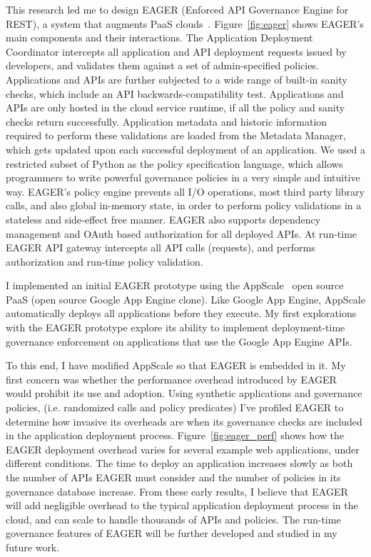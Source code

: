This research led me to design
EAGER (Enforced API Governance Engine for REST), a 
system that augments PaaS clouds~\cite{6903538}. 
Figure~\ref{fig:eager}  shows EAGER's main components and their interactions.
The Application Deployment Coordinator intercepts all application and API 
deployment requests issued by developers, and validates them against a set of 
admin-specified policies. Applications and APIs are further subjected to a wide 
range of built-in sanity checks, which include an API backwards-compatibility test.
Applications and APIs are only 
hosted in the cloud service runtime, if all the policy and sanity checks return successfully.
Application metadata and historic information required to perform these validations are 
loaded from the Metadata Manager, which gets updated upon each successful deployment
of an application. 
We used a 
restricted subset of Python as the policy specification language, which allows programmers 
to write powerful governance policies in a very simple and intuitive way. EAGER's policy engine 
prevents all I/O operations, most third party library calls, and also global in-memory state, in 
order to perform policy validations in a stateless and side-effect free manner. EAGER also 
supports dependency management and OAuth based authorization for all deployed APIs. 
At run-time EAGER API gateway
intercepts all API calls (requests), and performs authorization and run-time policy validation.

I implemented an initial EAGER 
prototype using the AppScale~\cite{krintzappscale13} open source PaaS (open
source Google App Engine clone).  Like Google App Engine, AppScale
automatically deploys all applications before they execute.  My first
explorations with the EAGER prototype explore its ability to implement
deployment-time governance enforcement on applications that use the Google
App Engine APIs.

To this end, I have modified AppScale so that EAGER is embedded in it.  My
first concern was whether the performance overhead introduced by EAGER would
prohibit its use and adoption.  Using synthetic applications and governance
policies, (i.e. randomized calls and policy predicates) I've profiled EAGER to
determine how invasive its overheads are when its governance checks are
included in the application deployment process.
Figure~\ref{fig:eager_perf}
shows how the EAGER deployment overhead varies for several example web applications, under different
conditions. The time to deploy an application increases slowly as both the
number of APIs EAGER must consider and the number of policies in its governance
database increase.
From these early results, I believe that EAGER will
add negligible overhead to the typical application deployment 
process in the cloud, and can scale to handle thousands of APIs and policies. 
The run-time governance features of EAGER will be further developed and studied in
my future work.

